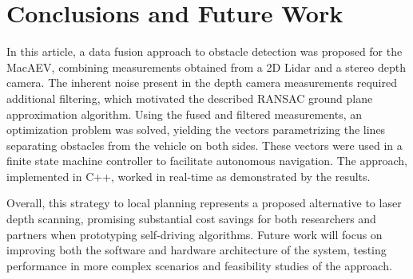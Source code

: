 \documentclass[conference]{IEEEtran}
\begin{document}
\section{Conclusions and Future Work}
In this article, a data fusion approach to obstacle detection was proposed for the MacAEV, combining measurements obtained from a 2D Lidar and a stereo depth camera. The inherent noise present in the depth camera measurements required additional filtering, which motivated the described RANSAC ground plane approximation algorithm. Using the fused and filtered measurements, an optimization problem was solved, yielding the vectors parametrizing the lines separating obstacles from the vehicle on both sides. These vectors were used in a finite state machine controller to facilitate autonomous navigation. The approach, implemented in C++, worked in real-time as demonstrated by the results.


Overall, this strategy to local planning represents a proposed alternative to laser depth scanning, promising substantial cost savings for both researchers and partners when prototyping self-driving algorithms. Future work will focus on improving both the software and hardware architecture of the system, testing performance in more complex scenarios and feasibility studies of the approach.   


 


\end{document}
